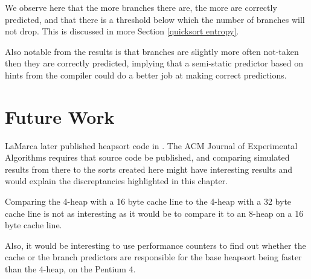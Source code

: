 \label{heapsort entropy}
We observe here that the more branches there are, the more are correctly
predicted, and that there is a threshold below which the number of branches will
not drop. This is discussed in more Section \ref{quicksort entropy}.

Also notable from the results is that branches are slightly more often not-taken
then they are correctly predicted, implying that a semi-static predictor based
on hints from the compiler could do a better job at making correct predictions.

\section{Future Work}

LaMarca later published heapsort code in \cite{LaMarcaHeap96}. The ACM
Journal of Experimental Algorithms requires that source code be published, and
comparing simulated results from there to the sorts created here might have
interesting results and would explain the discreptancies highlighted in this
chapter.

Comparing the 4-heap with a 16 byte cache line to the 4-heap with a 32 byte
cache line is not as interesting as it would be to compare it to an 8-heap on a
16 byte cache line.

Also, it would be interesting to use performance counters to find out whether
the cache or the branch predictors are responsible for the base heapsort being
faster than the 4-heap, on the Pentium 4.
